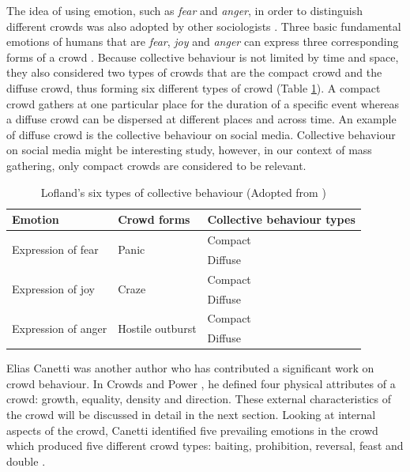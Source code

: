 The idea of using emotion, such as \textit{fear} and \textit{anger}, in order to distinguish different crowds was also adopted by other sociologists \citep{Lofland1985,Smelser1998}. Three basic fundamental emotions of humans that are \textit{fear}, \textit{joy} and \textit{anger} can express three corresponding forms of a crowd \citep{Imhonopi2013}. Because collective behaviour is not limited by time and space, they also considered two types of crowds that are the compact crowd and the diffuse crowd, thus forming six different types of crowd (Table \ref{table:loflandCollectiveBehaviourType}). A compact crowd gathers at one particular place for the duration of a specific event whereas a diffuse crowd can be dispersed at different places and across time. An example of diffuse crowd is the collective behaviour on social media. Collective behaviour on social media might be interesting study, however, in our context of mass gathering, only compact crowds are considered to be relevant.

\begin{table}[!htbp]
	\caption{Lofland's six types of collective behaviour (Adopted from \citet{FBI1967})}
	\label{table:loflandCollectiveBehaviourType}
	\centering
	\begin{tabular}{|l|l|l|}
		\hline
		\textbf{Emotion} & \textbf{Crowd forms} & \textbf{Collective behaviour types} \\ \hline \hline
		\multirow{2}{*}{Expression of fear} & \multirow{2}{*}{Panic} & Compact \\
		& & Diffuse \\ \hline
		\multirow{2}{*}{Expression of joy} & \multirow{2}{*}{Craze} & Compact \\
		& & Diffuse \\ \hline
		\multirow{2}{*}{Expression of anger} & \multirow{2}{*}{Hostile outburst} & Compact \\
		& & Diffuse \\ \hline
	\end{tabular}
\end{table}

Elias Canetti was another author who has contributed a significant work on crowd behaviour. In Crowds and Power \citep{Canetti1962}, he defined four physical attributes of a crowd: growth, equality, density and direction. These external characteristics of the crowd will be discussed in detail in the next section. Looking at internal aspects of the crowd, Canetti identified five prevailing emotions in the crowd which produced five different crowd types: baiting, prohibition, reversal, feast and double \citep{McClelland2010}.

